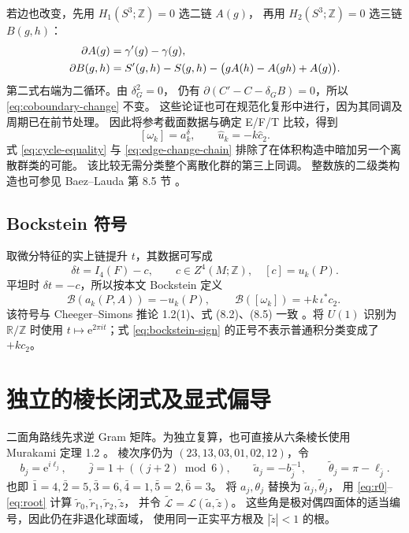 \documentclass[UTF8,11pt,fontset=none]{ctexart}
\numberwithin{equation}{section}
\theoremstyle{definition}
\newcommand{\R}{\mathbb R}
\newcommand{\Z}{\mathbb Z}
\newcommand{\ee}{\mathrm e}
\newcommand{\delG}{\delta_G}
\begin{document}
若边也改变，先用 $H_1(S^3;\Z)=0$ 选二链 $A(g)$，
再用 $H_2(S^3;\Z)=0$ 选三链 $B(g,h)$：
\begin{align}
 \partial A(g)&=\gamma'(g)-\gamma(g),\notag\\
 \partial B(g,h)&=S'(g,h)-S(g,h)
 -\big(gA(h)-A(gh)+A(g)\big).
 \label{eq:edge-change-chain}
\end{align}
第二式右端为二循环。由 $\delG^2=0$，
仍有 $\partial(C'-C-\delG B)=0$，所以 \eqref{eq:coboundary-change} 不变。
这些论证也可在规范化复形中进行，因为其同调及周期已在前节处理。
因此将参考截面数据与确定 E/F/T 比较，得到
\begin{equation}
 \boxed{\ [\omega_k]=a_k^\delta,\qquad
 \widehat u_k=-k\widehat c_2.\ }
 \label{eq:class-identification}
\end{equation}
式 \eqref{eq:cycle-equality} 与 \eqref{eq:edge-change-chain}
排除了在体积构造中暗加另一个离散群类的可能。
该比较无需分类整个离散化群的第三上同调。
整数族的二级类构造也可参见 Baez--Lauda 第 8.5 节 \cite{baezlauda}。

\subsection{Bockstein 符号}

取微分特征的实上链提升 $t$，其数据可写成
\[
 \delta t=I_4(F)-c,\qquad
 c\in Z^4(M;\Z),\quad[c]=u_k(P).
\]
平坦时 $\delta t=-c$，所以按本文 Bockstein 定义
\begin{equation}
 \mathcal B(a_k(P,A))=-u_k(P),\qquad
 \boxed{\ \mathcal B([\omega_k])=+k\,\iota^*c_2.\ }
 \label{eq:bockstein-sign}
\end{equation}
该符号与 Cheeger--Simons 推论 1.2(1)、式 (8.2)、(8.5) 一致
\cite{cheegersimons}。将 $U(1)$ 识别为 $\R/\Z$ 时使用
$t\mapsto\ee^{2\pi it}$；式 \eqref{eq:bockstein-sign}
的正号不表示普通积分类变成了 $+kc_2$。

\section{独立的棱长闭式及显式偏导}\label{sec:edgeformula}

二面角路线先求逆 Gram 矩阵。为独立复算，也可直接从六条棱长使用
Murakami 定理 1.2 \cite{murakami}。
棱次序仍为 $(23,13,03,01,02,12)$，令
\begin{equation}
 b_j=\ee^{i\ell_j},\qquad
 \bar j=1+((j+2)\bmod6),\qquad
 \widetilde a_j=-b_{\bar j}^{-1},\qquad
 \widetilde\theta_j=\pi-\ell_{\bar j}.
 \label{eq:edge-substitution}
\end{equation}
也即 $\bar1=4,\bar2=5,\bar3=6,\bar4=1,\bar5=2,\bar6=3$。
将 $a_j,\theta_j$ 替换为 $\widetilde a_j,\widetilde\theta_j$，
用 \eqref{eq:r0}--\eqref{eq:root} 计算
$\widetilde r_0,\widetilde r_1,\widetilde r_2,\widetilde z$，
并令
$\widetilde{\mathcal L}=\mathcal L(\widetilde a,\widetilde z)$。
这些角是极对偶四面体的适当编号，因此仍在非退化球面域，
使用同一正实平方根及 $|\widetilde z|<1$ 的根。
\end{document}

